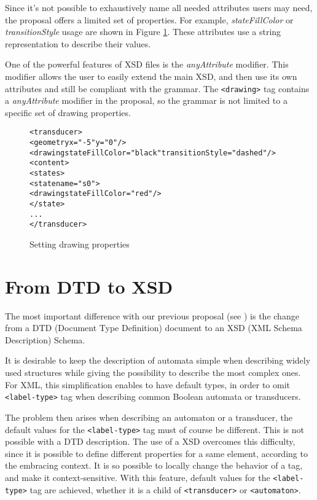 \documentclass[a4paper]{article}
\def\typetag{\texttt{<label-type>}}
\def\drawingtag{\texttt{<drawing>}}
\def\automatontag{\texttt{<automaton>}}
\def\transducertag{\texttt{<transducer>}}
\begin{document}
Since it's not possible to exhaustively name all needed attributes
users may need, the proposal offers a limited set of properties. For
example, \textit{stateFillColor} or \textit{transitionStyle} usage are
shown in Figure \ref{drawing1}. These attributes use a string
representation to describe their values.

One of the powerful features of XSD files is the
\textit{anyAttribute} modifier. This modifier allows the user to easily
extend the main XSD, and then use its own attributes and still be
compliant with the grammar. The \drawingtag{} tag contains a
\textit{anyAttribute} modifier in the proposal, so the grammar is not
limited to a specific set of drawing properties.

{\small

\begin{figure}[h]
  \begin{center}
\begin{alltt}
<transducer>
  <geometry x="-5" y="0"/>
  <drawing stateFillColor="black" transitionStyle="dashed"/>
  <content>
     <states>
        <state name="s0">
            <drawing stateFillColor="red"/>
        </state>
      ...
</transducer>
\end{alltt}

\caption{Setting drawing properties}
\label{drawing1}
  \end{center}
\end{figure}
}

\section{From DTD to XSD}
The most important difference with our previous proposal (see \cite{VXML04}) is
the change from a DTD (Document Type Definition) document to an XSD (XML Schema
Description) Schema.

It is desirable to keep the description of automata simple when
describing widely used structures while giving the possibility to
describe the most complex ones. For XML, this simplification enables
to have default types, in order to omit \typetag{} tag when
describing common Boolean automata or transducers.

The problem then arises when describing an automaton or a transducer,
the default values for the \typetag{} tag must of course be
different. This is not possible with a DTD description.  The use of a
XSD overcomes this difficulty, since it is possible to define
different properties for a same element, according to the embracing
context. It is so possible to locally change the behavior of a tag, and
make it context-sensitive. With this feature, default values for the
\typetag{} tag are achieved, whether it is a child of
\transducertag{} or \automatontag{}.\\
\end{document}
